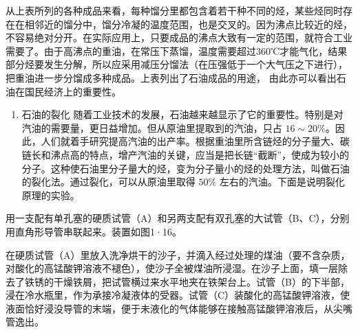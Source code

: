 从上表所列的各种成品来看，每种馏分里都包含着若干种不同的烃，某些烃同时存在在相邻近的馏分中，馏分冷凝的温度范围，也是交叉的。因为沸点比较近的烃，不容易绝对分开。在实际应用上，只要成品的沸点大致有一定的范围，就符合工业需要了。由于高沸点的重油，在常压下蒸馏，温度需要超过360℃才能气化，结果部分烃要发生分解，所以应采用减压分馏法（在压强低于一个大气压之下进行），
把重油进一步分馏成多种成品。上表列出了石油成品的用途，
由此亦可以看出石油在国民经济上的重要性。

\begin{enumerate}[start=2]
\item
  石油的裂化
  随着工业技术的发展，石油越来越显示了它的重要性。特别是对汽油的需要量，更日益增加。但从原油里提取到的汽油，只占
  \(16 \sim 20\%\)。因此，人们就着手研究提高汽油的出产率。根据重油里所含链烃的分子量大、碳链长和沸点高的特点，增产汽油的关键，应当是把长链``截断''，使成为较小的分子。这种使石油里分子量大的烃，变为分子量小的烃的处理方法，叫做石油的裂化法。通过裂化，可以从原油里取得
  \(50\%\) 左右的汽油。下面是说明裂化原理的实验。
\end{enumerate}

用一支配有单孔塞的硬质试管（A）和另两支配有双孔塞的大试管（B、C），分别用直角形导管串联起来。装置如图1·16。

在硬质试管（A）里放入洗净烘干的沙子，并滴入经过处理的煤油（要不含杂质，对酸化的高锰酸钾溶液不褪色），使沙子全被煤油所浸湿。在沙子上面，填一层除去了铁锈的干燥铁屑，把试管横过来水平地夹在铁架台上。试管（B）的下半部，浸在冷水瓶里，作为承接冷凝液体的受器。试管（C）装酸化的高锰酸钾溶液，使液面恰好浸没导管的末端，便于未液化的气体能够在接触高锰酸钾溶液后，从尖嘴管逸出。

